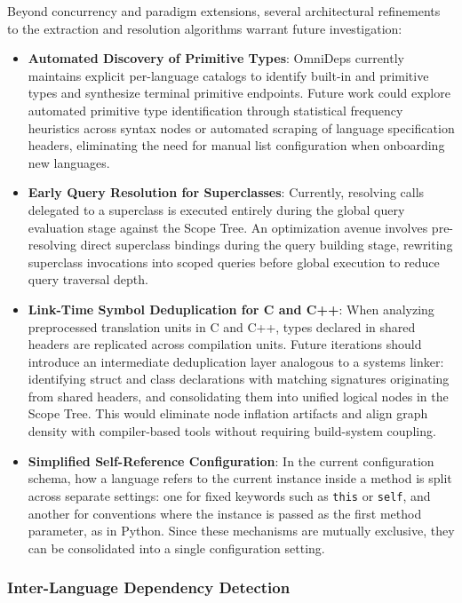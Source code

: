 Beyond concurrency and paradigm extensions, several architectural refinements
to the extraction and resolution algorithms warrant future investigation:
\begin{itemize}
  \item \textbf{Automated Discovery of Primitive Types}: OmniDeps
    currently\linebreak
    maintains explicit per-language catalogs to identify built-in and primitive
    types and synthesize terminal primitive endpoints. Future work could
    explore automated primitive type identification through statistical
    frequency heu\-ris\-tics across syntax nodes or automated
    scraping of language
    specification headers, eliminating the need for manual list configuration
    when onboarding new languages.
  \item \textbf{Early Query Resolution for Superclasses}: Currently, resolving
    calls delegated to a superclass is executed entirely during the global
    query evaluation stage against the Scope Tree. An optimization avenue
    involves pre-resolving direct superclass bindings during the query building
    stage, rewriting superclass invocations into scoped queries before global
    execution to reduce query traversal depth.
  \item \textbf{Link-Time Symbol Deduplication for C and C++}: When analyzing
    preprocessed translation units in C and C++, types declared in
    shared headers are replicated across compilation units. Future iterations
    should introduce an intermediate deduplication layer analogous to a systems
    linker: identifying struct and class declarations with matching signatures
    originating from shared headers, and consolidating them into unified
    logical nodes in the Scope Tree. This would eliminate node inflation
    artifacts and align graph density with compiler-based tools without
    requiring build-system coupling.
  \item \textbf{Simplified Self-Reference Configuration}: In the current
    configuration schema, how a language refers to the current instance inside
    a method is split across separate settings: one for fixed keywords such as
    \texttt{this} or \texttt{self}, and another for conventions where the
    instance is passed as the first method parameter, as in Python. Since these
    mechanisms are mutually exclusive, they can be consolidated into a single
    configuration setting.
\end{itemize}

\subsubsection{Inter-Language Dependency Detection}
\label{subsec:future_inter_language}

